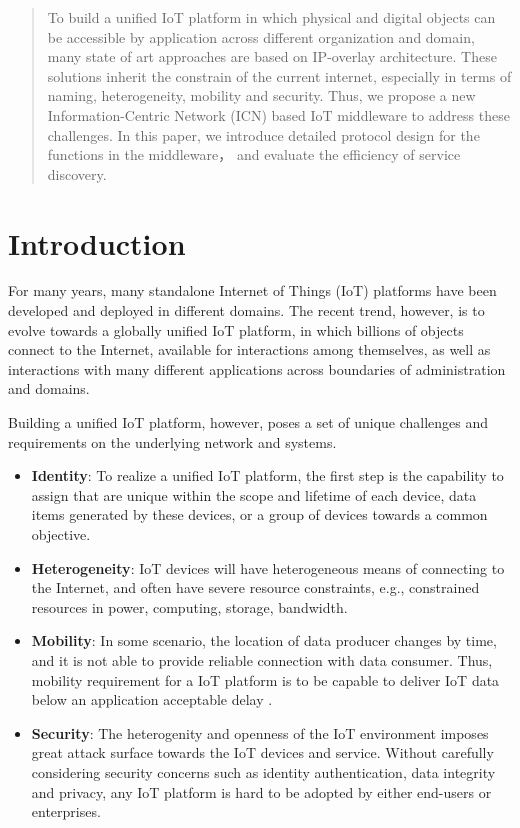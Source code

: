 \begin{abstract}
To build a unified IoT platform in which physical and digital objects can be accessible by application across different organization and domain, many state of art approaches are based on IP-overlay architecture. These solutions inherit the constrain of the current internet, especially in terms of naming, heterogeneity, mobility and security. Thus, we propose a new Information-Centric Network (ICN) based IoT middleware to address these challenges. In this paper, we introduce detailed protocol design for the functions in the middleware， and evaluate the efficiency of service discovery.
\end{abstract}

\section{Introduction}
For many years, many standalone Internet of Things (IoT) platforms have been developed and deployed in different domains. The recent trend, however, is to evolve towards a globally unified IoT platform, in which billions of objects connect to the Internet, available for interactions among themselves, as well as interactions with many different applications across boundaries of administration and domains. 


Building a unified IoT platform, however, poses a set of unique challenges and requirements on the underlying network and systems.
\begin{itemize}
\vspace{1mm}\item{\bf Identity}:
To realize a unified IoT platform, the first step is the capability to assign that are unique within the scope and lifetime of each device, data items generated by these devices, or a group of devices towards a common objective.
\vspace{1mm}\item{\bf Heterogeneity}:
IoT devices will have heterogeneous means of connecting to the Internet, and often have severe resource constraints, e.g., constrained resources in power, computing, storage, bandwidth.
\vspace{1mm}\item{\bf Mobility}:
In some scenario, the location of data producer changes by time, and it is not able to provide reliable connection with data consumer. Thus, mobility requirement for a IoT platform is to be capable to deliver IoT data below an application acceptable delay .
\vspace{1mm}\item{\bf Security}:
The heterogenity and openness of the IoT environment imposes great attack surface towards the IoT devices and service. Without carefully considering security concerns such as identity authentication, data integrity and privacy, any IoT platform is hard to be adopted by either end-users or enterprises.
\end{itemize}

